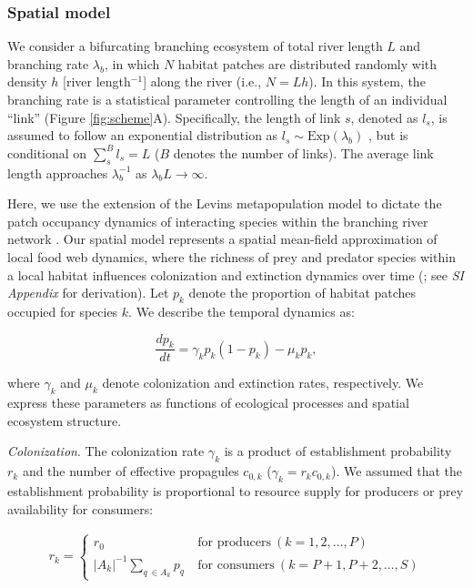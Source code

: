 \documentclass[11pt, class=article, crop=false]{standalone}
\begin{document}
\subsubsection{Spatial model}

We consider a bifurcating branching ecosystem of total river length $L$ and branching rate $\lambda_b$, in which $N$ habitat patches are distributed randomly with density $h$ [river length$^{-1}$] along the river (i.e., $N = Lh$).
In this system, the branching rate is a statistical parameter controlling the length of an individual ``link'' (Figure \ref{fig:scheme}A).
Specifically, the length of link $s$, denoted as $l_s$, is assumed to follow an exponential distribution as $l_s \sim \mbox{Exp}(\lambda_b)$ \citep{peckham_reformulation_1999, terui_metapopulation_2018, terui_emergent_2021}, but is conditional on $\sum_s^B l_s = L$ ($B$ denotes the number of links).
The average link length approaches $\lambda_b^{-1}$ as $\lambda_b L \rightarrow \infty$.

Here, we use the extension of the Levins metapopulation model to dictate the patch occupancy dynamics of interacting species within the branching river network \citep{calcagno_constraints_2011, takimoto_effects_2012, guo_towards_2023}.
Our spatial model represents a spatial mean-field approximation of local food web dynamics, where the richness of prey and predator species within a local habitat influences colonization and extinction dynamics over time (\citep{shibasaki_food_2024}; see \textit{SI Appendix} for derivation).
Let $p_k$ denote the proportion of habitat patches occupied for species $k$.
We describe the temporal dynamics as:

\begin{equation}
    \frac{dp_k}{dt} = \gamma_{k} p_k (1 - p_k) - \mu_k p_k,
\end{equation}

where $\gamma_k$ and $\mu_k$ denote colonization and extinction rates, respectively.
We express these parameters as functions of ecological processes and spatial ecosystem structure.

\textit{Colonization}. The colonization rate $\gamma_k$ is a product of establishment probability $r_k$ and the number of effective propagules $c_{0,k}$ ($\gamma_k = r_k c_{0,k}$).
We assumed that the establishment probability is proportional to resource supply for producers or prey availability for consumers:

\begin{align}
    r_{k} = 
    \begin{cases}
        r_0 & ~\text{for producers}~ (k=1, 2, \ldots, P)\\
        |A_{k}|^{-1} \sum_{q~\in A_{k}} p_{q} & ~\text{for consumers}~ (k=P+1, P+2, \ldots, S)
    \end{cases}
\end{align}
\end{document}
